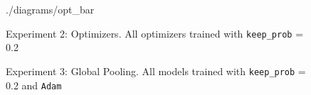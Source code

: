 \documentclass[12pt]{article}
\begin{document}
\begin{figure}[H]
{{    {./diagrams/opt_bar} }}%
    \qquad
    \caption{Experiment 2: Optimizers. 
    All optimizers trained 
    with {\tt keep\_prob} = 0.2}%
    \label{fig:example}%
    \centering
    \qquad
    \caption{Experiment 3: Global Pooling. All models 
    trained 
    with {\tt keep\_prob} = 0.2 and {\tt Adam}}%
    \label{fig:example}%
\end{figure}
\end{document}
